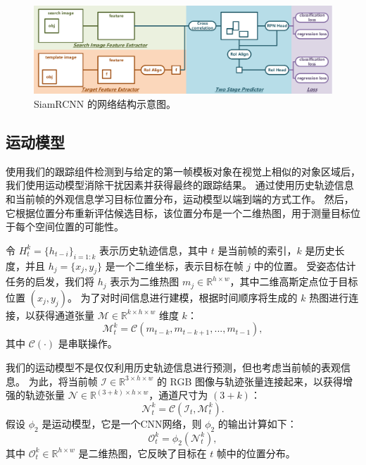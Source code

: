 \begin{figure}
    \centering
    \includegraphics[width=1.0\textwidth]{Img/globally/SiamRCNN.pdf}
    \caption{SiamRCNN 的网络结构示意图。}
    \label{fig:siamrcnn}
\end{figure}

\subsection{运动模型} 使用我们的跟踪组件检测到与给定的第一帧模板对象在视觉上相似的对象区域后，我们使用运动模型消除干扰因素并获得最终的跟踪结果。
通过使用历史轨迹信息和当前帧的外观信息学习目标位置分布，运动模型以端到端的方式工作。
然后，它根据位置分布重新评估候选目标，该位置分布是一个二维热图，用于测量目标位于每个空间位置的可能性。

令 $H_{t}^{k} = \{h_{t-i}\}_{i=1:k}$ 表示历史轨迹信息，其中 $t$ 是当前帧的索引，$k$ 是历史长度，并且 $h_{j} = \{x_{j}, y_{j}\}$ 是一个二维坐标，表示目标在帧 $j$ 中的位置。
受姿态估计任务的启发，我们将 $h_{j}$ 表示为二维热图 $m_{j} \in \mathbb R^{h \times w}$，其中二维高斯定点位于目标位置 $(x_{j}, y_{j})$。
为了对时间信息进行建模，根据时间顺序将生成的 $k$ 热图进行连接，以获得通道张量 $\mathcal{M} \in \mathbb{R}^{k \times h \times w}$ 维度 $k$：
\begin{equation}
    \mathcal{M}_{t}^{k} = \mathcal{C}(m_{t-k}, m_{t-k+1}, ..., m_{t-1}),
\end{equation}
其中 $\mathcal{C}(\cdot)$ 是串联操作。

我们的运动模型不是仅仅利用历史轨迹信息进行预测，但也考虑当前帧的表观信息。
为此，将当前帧 $\mathcal{I} \in \mathbb{R}^{3 \times h \times w}$ 的 RGB 图像与轨迹张量连接起来，以获得增强的轨迹张量 $\mathcal{N} \in \mathbb{R}^{(3+k) \times h \times w}$，通道尺寸为 $(3+k)$：
\begin{equation}
    \mathcal{N}_{t}^{k} = \mathcal{C}(\mathcal{I}_{t}, \mathcal{M}_{t}^{k}).
\end{equation}
假设 $\phi_{2}$ 是运动模型，它是一个CNN网络，则 $\phi_{2}$ 的输出计算如下：
\begin{equation}
    \mathcal{O}_{t}^{k} = \phi_{2}(\mathcal{N}_{t}^{k}),
\end{equation}
其中 $\mathcal{O}_{t}^{k} \in \mathbb{R}^{h \times w}$ 是二维热图，它反映了目标在 $t$ 帧中的位置分布。


